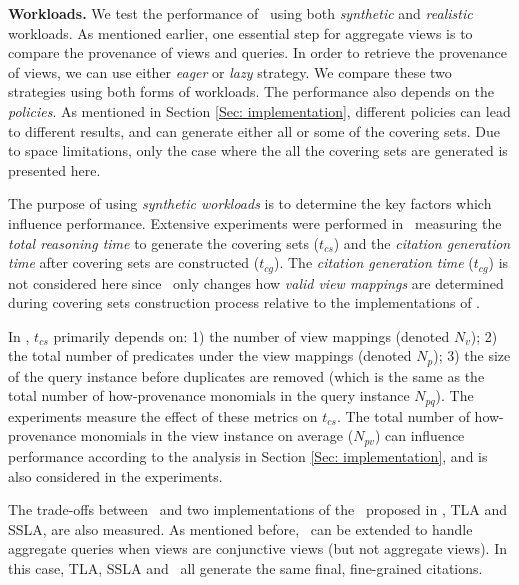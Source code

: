 {\bf Workloads.} 
We test the performance of \provalg\ using both {\em synthetic} and {\em realistic} workloads. As mentioned earlier,  one essential step for aggregate views is to compare the provenance of views and queries. In order to retrieve the provenance of views, we can use either {\em eager} or {\em lazy} strategy.  We compare these two strategies using both forms of workloads. The performance also depends on the {\em policies}. As mentioned in Section \ref{Sec: implementation}, different policies can lead to different results, and can generate either all or some of the covering sets. Due to space limitations, only the case where the all the covering sets are generated is presented here.

The purpose of using {\em synthetic workloads} is to determine the key factors which influence performance. 
Extensive experiments were performed in~\cite{wu2018data} measuring the \textit{total reasoning time}  to generate the covering sets ($t_{cs}$)
 and the \textit{citation generation time}   after covering sets are constructed ($t_{cg}$).  The \textit{citation generation time} ($t_{cg}$) is not considered here since \provalg\ only changes how {\em valid view mappings} are determined during covering sets construction process %
relative to the implementations of \rba. %


In \cite{wu2018data}, $t_{cs}$ primarily depends on: 1) the number of view mappings (denoted $N_v$); 2) the total number of predicates under the view mappings (denoted $N_p$); 3) the size of the query instance before duplicates are removed (which is the same as the total number of how-provenance monomials in the query instance $N_{pq}$). The experiments measure the effect of these metrics on $t_{cs}$. %
The total number of how-provenance monomials in the view instance on average ($N_{pv}$) can influence performance according to the analysis in Section \ref{Sec: implementation}, and is also considered in the experiments.

The trade-offs between \provalg\ and two implementations of the \rba\ proposed in \cite{wu2018data}, TLA and SSLA, are also  measured. 
As mentioned before, \rba\ can be extended to handle aggregate queries when views are conjunctive views (but not aggregate views). In this case, TLA, SSLA and \provalg\ all generate the same final, fine-grained citations.

